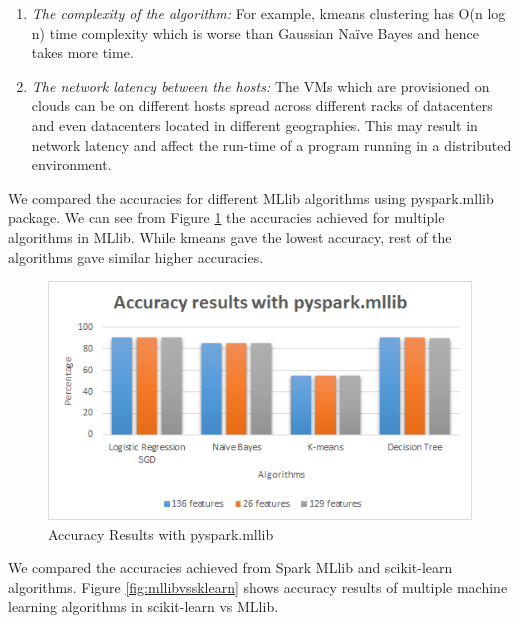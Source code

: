 \documentclass[9pt,twocolumn,twoside]{../../styles/osajnl}
\begin{document}
\begin{enumerate}
 \item \textit{The complexity of the algorithm:} For example,  kmeans clustering has  O(n log n) time complexity which is worse than Gaussian Naïve Bayes and hence takes more time.

 \item \textit{The network latency between the hosts:} The VMs which are provisioned on clouds can be on different hosts spread across different racks of datacenters and even datacenters located in different geographies. This may result in network latency and affect the run-time of a program running in a distributed environment.
\end{enumerate}

We compared the accuracies for different MLlib algorithms using pyspark.mllib package. We can see from Figure \ref{fig:accmllib} the accuracies achieved for multiple algorithms in MLlib. While kmeans gave the lowest accuracy, rest of the algorithms gave similar higher accuracies.

\begin{figure}[h]
\centering
\includegraphics[width=\linewidth]{images/accmllib.png}
\caption{Accuracy Results with pyspark.mllib}
\label{fig:accmllib}
\end{figure}

We compared the accuracies achieved from Spark MLlib and scikit-learn algorithms. Figure \ref{fig:mllibvssklearn} shows accuracy results of multiple machine learning algorithms in scikit-learn vs MLlib.
\end{document}
